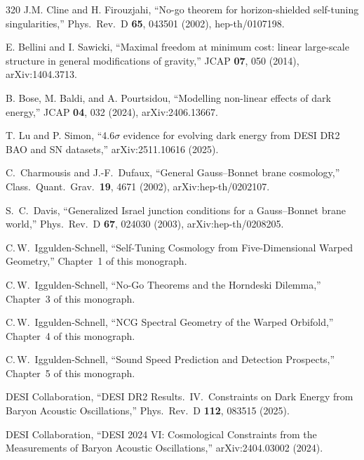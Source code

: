 \begin{thebibliography}{320}
J.M. Cline and H. Firouzjahi,
``No-go theorem for horizon-shielded self-tuning singularities,''
Phys.\ Rev.\ D \textbf{65}, 043501 (2002), hep-th/0107198.

E. Bellini and I. Sawicki,
``Maximal freedom at minimum cost: linear large-scale structure in general modifications of gravity,''
JCAP \textbf{07}, 050 (2014), arXiv:1404.3713.

B. Bose, M. Baldi, and A. Pourtsidou,
``Modelling non-linear effects of dark energy,''
JCAP \textbf{04}, 032 (2024), arXiv:2406.13667.

T. Lu and P. Simon,
``4.6$\sigma$ evidence for evolving dark energy from DESI DR2 BAO and SN datasets,''
arXiv:2511.10616 (2025).

C.~Charmousis and J.-F.~Dufaux,
``General Gauss--Bonnet brane cosmology,''
Class.\ Quant.\ Grav.\ \textbf{19}, 4671 (2002),
arXiv:hep-th/0202107.

S.~C.~Davis,
``Generalized Israel junction conditions for a Gauss--Bonnet brane world,''
Phys.\ Rev.\ D \textbf{67}, 024030 (2003),
arXiv:hep-th/0208205.



C.\,W.\ Iggulden-Schnell,
``Self-Tuning Cosmology from Five-Dimensional Warped Geometry,''
Chapter~1 of this monograph.

C.\,W.\ Iggulden-Schnell,
``No-Go Theorems and the Horndeski Dilemma,''
Chapter~3 of this monograph.

C.\,W.\ Iggulden-Schnell,
``NCG Spectral Geometry of the Warped Orbifold,''
Chapter~4 of this monograph.

C.\,W.\ Iggulden-Schnell,
``Sound Speed Prediction and Detection Prospects,''
Chapter~5 of this monograph.

DESI Collaboration,
``DESI DR2 Results.\ IV.\ Constraints on Dark Energy from Baryon Acoustic Oscillations,''
Phys.\ Rev.\ D \textbf{112}, 083515 (2025).

DESI Collaboration,
``DESI 2024 VI: Cosmological Constraints from the Measurements of Baryon Acoustic Oscillations,''
arXiv:2404.03002 (2024).


\end{thebibliography}
